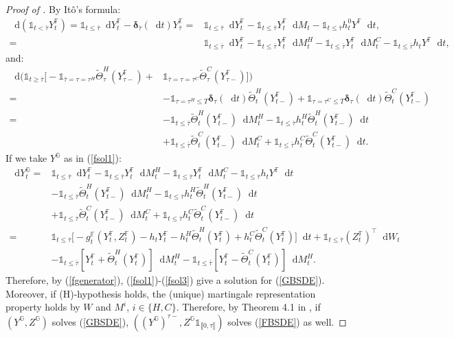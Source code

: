 \documentclass[a4paper, 11pt]{article}              %
\numberwithin{equation}{section}
\theoremstyle{plain}
\newcommand{\btau}{\bar{\tau}}
\newcommand{\1}{\mathds{1}}
\newcommand{\dsF}{\mathbb{F}}
\newcommand{\dsG}{\mathbb{G}}
\newcommand{\Jt}{\tilde{\Theta}}
\theoremstyle{plain}
\theoremstyle{definition}
\theoremstyle{plain}
\newcommand*\df{\mathop{}\!\mathrm{d}}
\begin{document}
\begin{proof}[Proof of ]
By It\^o's formula:
\begin{align}
  \df (\1_{t <\btau}Y^{\dsF}_t) = \1_{t \leq \btau}\df
  Y^\dsF_t - \bm{\delta}_{\btau}(\df t)Y^\dsF_{\btau}
  =&
  \1_{t \leq \btau}\df Y^\dsF_t - \1_{t \leq \btau}Y^\dsF_t\df M_t - \1_{t \leq
     \btau}h^0_tY^\dsF\df t, \nonumber\\
  =&\1_{t \leq \btau}\df Y^\dsF_t - \1_{t \leq \btau}Y^\dsF_t\df M^H_t
     - \1_{t \leq \btau}Y^\dsF_t\df M^C_t- \1_{t \leq
     \btau}h_tY^\dsF\df t, \nonumber 
\end{align}
and:
\begin{align}
\df\Big(\1_{t \geq \btau} \big[-\1_{\btau=\tau=\tau^H}
  \Jt^{ H}_{\tau}(Y^{\dsF}_{\tau-})+&\1_{\btau=\tau=\tau^C}\Jt^{  C}_{\tau}(Y^{\dsF}_{\tau-}) \big]\Big) \nonumber\\
  =&-\1_{\tau=\tau^H\leq T }\bm{\delta}_{\tau}(\df  t)\Jt^{ H}_t(Y^{\dsF}_{t-})
  +\1_{\tau=\tau^C\leq T }\bm{\delta}_{\tau}(\df t)\Jt^{  C}_t(Y^{\dsF}_{t-}) \nonumber\\
  =&-\1_{t\leq \btau}\Jt^{ H}_t(Y^{\dsF}_{t-})\df M^H_t - \1_{t \leq
     \btau}h_t^H\Jt^{ H}_t(Y^{\dsF}_{t-})\df t\nonumber\\
   &+\1_{t\leq \btau}\Jt^{  C}_t(Y^{\dsF}_{t-})\df M^C_t
     + \1_{t \leq \btau}h_t^C\Jt^{  C}_t(Y^{\dsF}_{t-})\df t. \nonumber 
\end{align}
If we take $Y^\dsG$ as in (\ref{fsol1}):
\begin{align}
 \df Y_t^\dsG =& \1_{t \leq \btau}\df Y^\dsF_t - \1_{t \leq \btau}Y^\dsF_t\df M^H_t
     - \1_{t \leq \btau}Y^\dsF_t\df M^C_t- \1_{t \leq
  \btau}h_tY^\dsF\df t \nonumber\\
  &-\1_{t\leq \btau}\Jt^{ H}_t(Y^{\dsF}_{t-})\df M^H_t - \1_{t \leq
     \btau}h_t^H\Jt^{ H}_t(Y^{\dsF}_{t-})\df t
    \nonumber\\
  &+\1_{t\leq \btau}\Jt^{  C}_t(Y^{\dsF}_{t-})\df M^C_t
    + \1_{t \leq \btau}h_t^C\Jt^{  C}_t(Y^{\dsF}_{t-})\df t \nonumber\\
  =&\1_{t \leq \btau}\Big[-g^\dsF_t(Y^\dsF_t, Z^\dsF_t) - h_tY^\dsF_t -
     h^H_t\Jt^{ H}_t(Y^\dsF_t) + h^C_t\Jt^{  C}_t(Y^\dsF_t)\Big]\df t + \1_{t \leq
     \btau}(Z^\dsF_t)^\top \df W_t \nonumber\\
             & -\1_{t \leq \btau}[Y^\dsF_t + \Jt^{ H}_t(Y^\dsF_t)]\df M^H_t
               -\1_{t \leq \btau}[Y^\dsF_t - \Jt^{  C}_t(Y^\dsF_t)]\df M^H_t. \nonumber 
\end{align}
Therefore, by (\ref{fgenerator}), (\ref{fsol1})-(\ref{fsol3}) give
 a solution for (\ref{GBSDE}). Moreover, if (H)-hypothesis holds,
the (unique) martingale representation property holds by $W$ and $M^i$,
$i \in \{H, C\}$. Therefore, by Theorem 4.1 in \cite{crepey2015bsdes}, if
$(Y^\dsG, Z^\dsG)$ solves (\ref{GBSDE}), $((Y^\dsG)^{\tau-}, Z^\dsG\1_{\llbracket 0, \tau\llbracket})$ solves
(\ref{FBSDE}) as well.
\end{proof}
\iffalse
\end{document}
